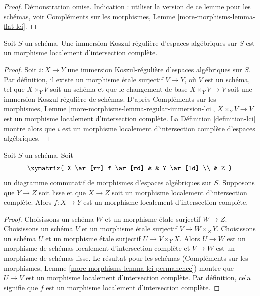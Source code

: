 \begin{proof}
Démonstration omise. Indication : utiliser la version de ce lemme pour les schémas, voir
Compléments sur les morphismes,
Lemme \ref{more-morphisms-lemma-flat-lci}.
\end{proof}

\begin{lemma}
\label{lemma-regular-immersion-lci}
Soit $S$ un schéma. Une immersion Koszul-régulière d'espaces algébriques
sur $S$ est un morphisme localement d'intersection complète.
\end{lemma}

\begin{proof}
Soit $i : X \to Y$ une immersion Koszul-régulière d'espaces algébriques
sur $S$. Par définition, il existe un morphisme étale surjectif
$V \to Y$, où $V$ est un schéma, tel que $X \times_Y V$ soit un schéma
et que le changement de base $X \times_Y V \to V$ soit une immersion Koszul-régulière de
schémas. D'après Compléments sur les morphismes, Lemme
\ref{more-morphisms-lemma-regular-immersion-lci},
$X \times_Y V \to V$ est un morphisme localement d'intersection complète.
La Définition \ref{definition-lci} montre alors que $i$ est un
morphisme localement d'intersection complète d'espaces algébriques.
\end{proof}

\begin{lemma}
\label{lemma-lci-permanence}
Soit $S$ un schéma. Soit
$$
\xymatrix{
X \ar[rr]_f \ar[rd] & & Y \ar[ld] \\
& Z
}
$$
un diagramme commutatif de morphismes d'espaces algébriques sur $S$.
Supposons que $Y \to Z$ soit lisse et que $X \to Z$ soit un
morphisme localement d'intersection complète.
Alors $f : X \to Y$ est un morphisme localement d'intersection complète.
\end{lemma}

\begin{proof}
Choisissons un schéma $W$ et un morphisme étale surjectif $W \to Z$.
Choisissons un schéma $V$ et un morphisme étale surjectif $V \to W \times_Z Y$.
Choisissons un schéma $U$ et un morphisme étale surjectif $U \to V \times_Y X$.
Alors $U \to W$ est un morphisme de schémas localement d'intersection complète et
$V \to W$ est un morphisme de schémas lisse. Le résultat pour les schémas
(Compléments sur les morphismes, Lemme \ref{more-morphisms-lemma-lci-permanence})
montre que $U \to V$ est un morphisme localement d'intersection complète.
Par définition, cela signifie que $f$ est un morphisme localement d'intersection complète.
\end{proof}

